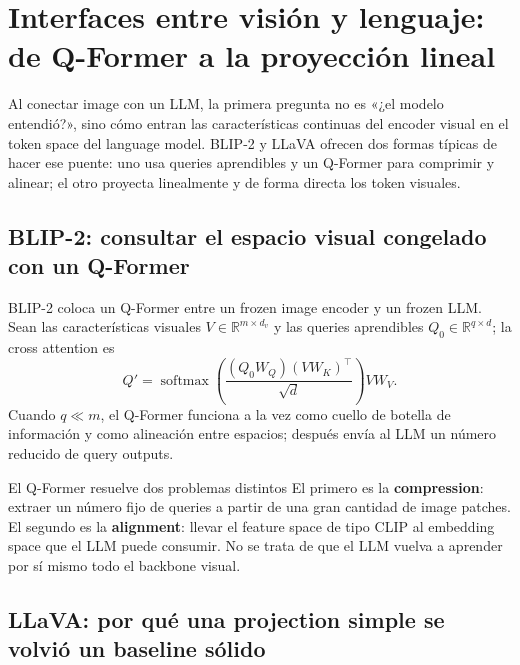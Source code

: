 \section{Interfaces entre visión y lenguaje: de Q-Former a la proyección lineal}

Al conectar image con un LLM, la primera pregunta no es «¿el modelo entendió?», sino cómo entran las características continuas del encoder visual en el token space del language model. BLIP-2 y LLaVA ofrecen dos formas típicas de hacer ese puente: uno usa queries aprendibles y un Q-Former para comprimir y alinear; el otro proyecta linealmente y de forma directa los token visuales.

\subsection{BLIP-2: consultar el espacio visual congelado con un Q-Former}

BLIP-2 coloca un Q-Former entre un frozen image encoder y un frozen LLM. Sean las características visuales $V\in\mathbb{R}^{m\times d_v}$ y las queries aprendibles $Q_0\in\mathbb{R}^{q\times d}$; la cross attention es
\[
Q'=\operatorname{softmax}\!\left(\frac{(Q_0W_Q)(VW_K)^\top}{\sqrt d}\right)VW_V.
\]
Cuando $q\ll m$, el Q-Former funciona a la vez como cuello de botella de información y como alineación entre espacios; después envía al LLM un número reducido de query outputs.


\begin{knowledgebox}{El Q-Former resuelve dos problemas distintos}
El primero es la \textbf{compression}: extraer un número fijo de queries a partir de una gran cantidad de image patches. El segundo es la \textbf{alignment}: llevar el feature space de tipo CLIP al embedding space que el LLM puede consumir. No se trata de que el LLM vuelva a aprender por sí mismo todo el backbone visual.
\end{knowledgebox}


\subsection{LLaVA: por qué una projection simple se volvió un baseline sólido}

